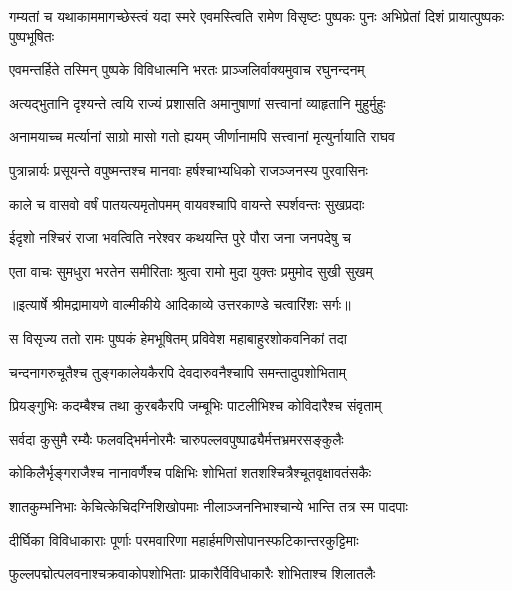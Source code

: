 \threelineshloka
{गम्यतां च यथाकाममागच्छेस्त्वं यदा स्मरे}
{एवमस्त्विति रामेण विसृष्टः पुष्पकः पुनः}
{अभिप्रेतां दिशं प्रायात्पुष्पकः पुष्पभूषितः} %

\twolineshloka
{एवमन्तर्हिते तस्मिन् पुष्पके विविधात्मनि}
{भरतः प्राञ्जलिर्वाक्यमुवाच रघुनन्दनम्} %

\twolineshloka
{अत्यद्भुतानि दृश्यन्ते त्वयि राज्यं प्रशासति}
{अमानुषाणां सत्त्वानां व्याहृतानि मुहुर्मुहुः} %

\twolineshloka
{अनामयाच्च मर्त्यानां साग्रो मासो गतो ह्ययम्}
{जीर्णानामपि सत्त्वानां मृत्युर्नायाति राघव} %

\twolineshloka
{पुत्रान्नार्यः प्रसूयन्ते वपुष्मन्तश्च मानवाः}
{हर्षश्चाभ्यधिको राजञ्जनस्य पुरवासिनः} %

\twolineshloka
{काले च वासवो वर्षं पातयत्यमृतोपमम्}
{वायवश्चापि वायन्ते स्पर्शवन्तः सुखप्रदाः} %

\twolineshloka
{ईदृशो नश्चिरं राजा भवत्विति नरेश्वर}
{कथयन्ति पुरे पौरा जना जनपदेषु च} %

\twolineshloka
{एता वाचः सुमधुरा भरतेन समीरिताः}
{श्रुत्वा रामो मुदा युक्तः प्रमुमोद सुखी सुखम्} %


{॥इत्यार्षे श्रीमद्रामायणे वाल्मीकीये आदिकाव्ये उत्तरकाण्डे चत्वारिंशः सर्गः॥}


\twolineshloka
{स विसृज्य ततो रामः पुष्पकं हेमभूषितम्}
{प्रविवेश महाबाहुरशोकवनिकां तदा} %

\twolineshloka
{चन्दनागरुचूतैश्च तुङ्गकालेयकैरपि}
{देवदारुवनैश्चापि समन्तादुपशोभिताम्} %

\twolineshloka
{प्रियङ्गुभिः कदम्बैश्च तथा कुरबकैरपि}
{जम्बूभिः पाटलीभिश्च कोविदारैश्च संवृताम्} %

\twolineshloka
{सर्वदा कुसुमै रम्यैः फलवद्भिर्मनोरमैः}
{चारुपल्लवपुष्पाढ्यैर्मत्तभ्रमरसङ्कुलैः} %

\twolineshloka
{कोकिलैर्भृङ्गराजैश्च नानावर्णैश्च पक्षिभिः}
{शोभितां शतशश्चित्रैश्चूतवृक्षावतंसकैः} %

\twolineshloka
{शातकुम्भनिभाः केचित्केचिदग्निशिखोपमाः}
{नीलाञ्जननिभाश्चान्ये भान्ति तत्र स्म पादपाः} %

\twolineshloka
{दीर्घिका विविधाकाराः पूर्णाः परमवारिणा}
{महार्हमणिसोपानस्फटिकान्तरकुट्टिमाः} %

\twolineshloka
{फुल्लपद्मोत्पलवनाश्चक्रवाकोपशोभिताः}
{प्राकारैर्विविधाकारैः शोभिताश्च शिलातलैः} %

